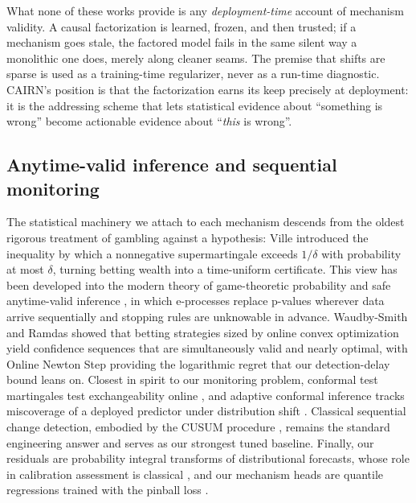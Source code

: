 \documentclass[preprint,12pt]{elsarticle}
\theoremstyle{definition}
\theoremstyle{remark}
\begin{document}
What none of these works provide is any \emph{deployment-time} account
of mechanism validity. A causal factorization is learned, frozen, and
then trusted; if a mechanism goes stale, the factored model fails in the
same silent way a monolithic one does, merely along cleaner seams. The
premise that shifts are sparse is used as a training-time regularizer,
never as a run-time diagnostic. CAIRN's position is that the
factorization earns its keep precisely at deployment: it is the
addressing scheme that lets statistical evidence about ``something is
wrong'' become actionable evidence about ``\emph{this} is wrong''.

\subsection{Anytime-valid inference and sequential monitoring}

The statistical machinery we attach to each mechanism descends from the
oldest rigorous treatment of gambling against a hypothesis:
Ville \citep{ville1939etude} introduced the inequality by which a nonnegative
supermartingale exceeds $1/\delta$ with probability at most $\delta$,
turning betting wealth into a time-uniform certificate. This view has
been developed into the modern theory of game-theoretic probability and
safe anytime-valid inference
\citep{shafer2019game,ramdas2023game}, in which e-processes replace
p-values wherever data arrive sequentially and stopping rules are
unknowable in advance. Waudby-Smith and Ramdas \citep{waudbysmith2024estimating} showed that
betting strategies sized by online convex optimization yield
confidence sequences that are simultaneously valid and nearly optimal,
with Online Newton Step \citep{hazan2007logarithmic} providing the
logarithmic regret that our detection-delay bound leans on. Closest in
spirit to our monitoring problem, conformal test martingales test
exchangeability online \citep{vovk2005algorithmic,vovk2021testing}, and
adaptive conformal inference tracks miscoverage of a deployed predictor
under distribution shift \citep{gibbs2021adaptive}. Classical sequential
change detection, embodied by the CUSUM procedure
\citep{page1954continuous}, remains the standard engineering answer and
serves as our strongest tuned baseline. Finally, our residuals are
probability integral transforms of distributional forecasts, whose role
in calibration assessment is classical \citep{gneiting2007probabilistic},
and our mechanism heads are quantile regressions trained with the
pinball loss \citep{koenker1978regression}.
\end{document}
